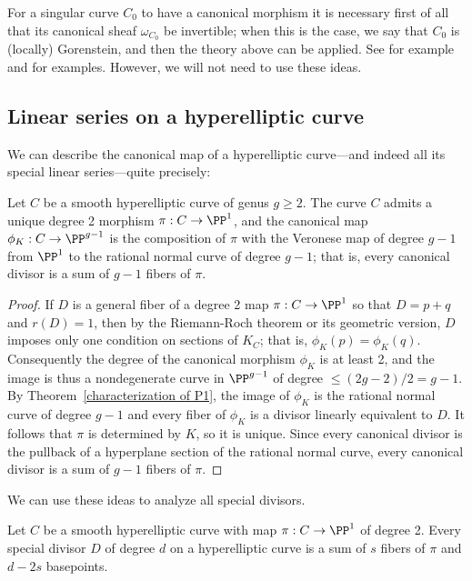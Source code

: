 \begin{remark}
For a singular curve $C_0$ to have a canonical morphism it is necessary first of all that its canonical sheaf
 $\omega_{C_0}$ be invertible; when this is the case, we say that $C_0$ is (locally) Gorenstein, and then
the theory above can be applied. See for example \cite{graphcurves} and \cite{ribbons} for examples. 
However, we will not need to use these ideas.
\end{remark}

\subsection{Linear series on a hyperelliptic curve}
We can describe the canonical map of a hyperelliptic curve---and indeed all its special linear series---quite precisely:

\begin{corollary}\label{canonical on hyperelliptic}
Let $C$ be a smooth hyperelliptic curve of genus $g\geq 2$. The curve $C$ admits a unique degree 2 morphism $\pi: C\to \PP^1$,
and the canonical map $\phi_K: C\to \PP^{g-1}$ is the composition of $\pi$ with the Veronese map of degree $g-1$ from
$\PP^1$ to the rational normal curve of degree $g-1$; that is, every canonical divisor is a sum of $g-1$ fibers of $\pi$.
\end{corollary}

\begin{proof}
If $D$ is a general fiber of a degree 2 map $\pi:C\to \PP^1$ so that $D= p+q$ and $r(D) = 1$, then by the Riemann-Roch theorem or its geometric version, $D$ imposes only one condition on sections of $K_C$; that is, $\phi_K(p) = \phi_K(q)$. Consequently the degree of the canonical morphism $\phi_K$ is at least 2, and the image is thus a nondegenerate curve in $\PP^{g-1}$ of degree $\leq (2g-2)/2 = g-1$. By Theorem~\ref{characterization of P1}, the image of $\phi_K$ is the rational normal curve of degree $g-1$ and every fiber of $\phi_K$ is a divisor linearly equivalent to $D$. It follows that $\pi$ is determined by $K$, so it is unique. Since every canonical divisor is the pullback of a hyperplane section of the rational normal curve,
every canonical divisor is a sum of $g-1$ fibers of $\pi$.
\end{proof}

We can use these ideas to analyze all special divisors.

\begin{corollary}\label{special on hyperelliptic} Let $C$ be a smooth hyperelliptic curve with map $\pi: C\to \PP^1$ of degree 2.
Every special divisor $D$ of degree $d$ on a hyperelliptic curve is a sum of $s$ fibers of $\pi$ and $d-2s$ basepoints.
\end{corollary}

